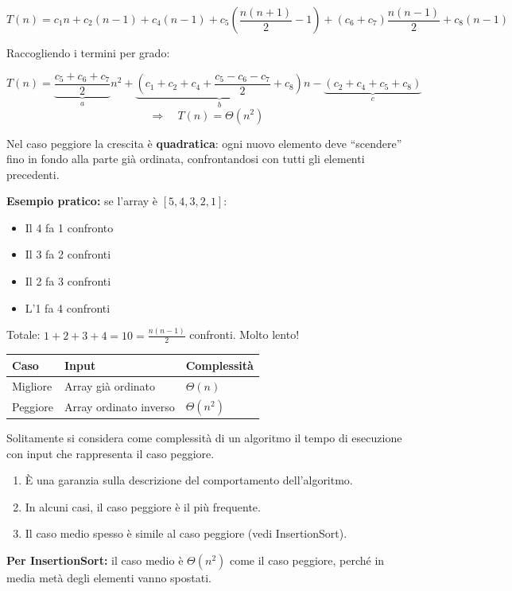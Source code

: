 \documentclass[a4paper, 11pt]{article}
\theoremstyle{definition}
\theoremstyle{remark}
\theoremstyle{remark}
\newenvironment{nota}{%
	\begin{tcolorbox}[
		colback=codebg,
		colframe=primary,
		fonttitle=\bfseries,
		title=Nota,
		left=6pt, right=6pt, top=4pt, bottom=4pt
		]
	}{%
	\end{tcolorbox}
}
\begin{document}
	\[
	T(n) = c_1 n + c_2(n-1) + c_4(n-1)
	+ c_5\!\left(\frac{n(n+1)}{2} - 1\right)
	+ (c_6 + c_7)\frac{n(n-1)}{2}
	+ c_8(n-1)
	\]
	
	Raccogliendo i termini per grado:
	
	\[
	T(n) = \underbrace{\frac{c_5 + c_6 + c_7}{2}}_{a} n^2
	+ \underbrace{\left(c_1 + c_2 + c_4 + \frac{c_5 - c_6 - c_7}{2} + c_8\right)}_{b} n
	- \underbrace{(c_2 + c_4 + c_5 + c_8)}_{c}
	\]
	\[
	\Rightarrow \quad \boxed{T(n) = \Theta(n^2)}
	\]
	
	\begin{nota}
		Nel caso peggiore la crescita è \textbf{quadratica}: ogni nuovo
		elemento deve ``scendere'' fino in fondo alla parte già ordinata,
		confrontandosi con tutti gli elementi precedenti.
		
		\textbf{Esempio pratico:} se l'array è $[5, 4, 3, 2, 1]$:
		\begin{itemize}
			\item Il 4 fa 1 confronto
			\item Il 3 fa 2 confronti
			\item Il 2 fa 3 confronti
			\item L'1 fa 4 confronti
		\end{itemize}
		Totale: $1 + 2 + 3 + 4 = 10 = \frac{n(n-1)}{2}$ confronti. Molto lento!
	\end{nota}
	
	\begin{center}
		\begin{tabular}{lll}
			\toprule
			Caso & Input & Complessità \\
			\midrule
			Migliore & Array già ordinato      & $\Theta(n)$   \\
			Peggiore & Array ordinato inverso  & $\Theta(n^2)$ \\
			\bottomrule
		\end{tabular}
	\end{center}
	
	\begin{hardnote}
		Solitamente si considera come complessità di un algoritmo il
		tempo di esecuzione con input che rappresenta il caso peggiore.
		
		\begin{enumerate}[label=\arabic*.]
			\item È una garanzia sulla descrizione del comportamento dell'algoritmo.
			\item In alcuni casi, il caso peggiore è il più frequente.
			\item Il caso medio spesso è simile al caso peggiore (vedi InsertionSort).
		\end{enumerate}
		
		\textbf{Per InsertionSort:} il caso medio è $\Theta(n^2)$ come il caso peggiore, perché in media metà degli elementi vanno spostati.
	\end{hardnote}
	
\end{document}
